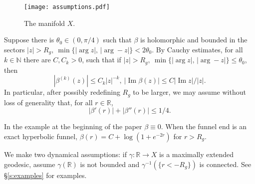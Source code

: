 \documentclass[reqno, 12pt]{amsart}
\newcommand \N {\mathbb{N}}
\newcommand \R {\mathbb{R}}
\DeclareMathOperator \im {Im}
\theoremstyle{definition}
\numberwithin{equation}{section}
\numberwithin{prop}{section}
\numberwithin{figure}{section}
\begin{document}
\begin{figure}[htbp]
\texttt{[image: assumptions.pdf]}
\caption{The manifold $X$.}\label{f:mfld}
\end{figure}

Suppose there is $\theta_0 \in (0,\pi/4)$ such that $\beta$ is holomorphic and bounded in the sectors $|z| > R_g,\ \min\{|\arg z|,\, |\arg -z|\} < 2\theta_0$. By Cauchy estimates,  for all $k \in \N$ there are $C, C_k >0$,  such that if $|z| > R_g,\ \min\{|\arg z|,\, |\arg -z|\} \le \theta_0$, then 
\[
|\beta^{(k)}(z)| \le C_k |z|^{-k}, \ |\im \beta(z)| \le C |\im z|/|z|.
\]
In particular, after possibly redefining $R_g$ to be larger, we may assume without loss of generality that, for all $r \in \R$,
\begin{equation}\label{e:betahalf}
|\beta'(r)| + |\beta''(r)| \le 1/4.
\end{equation}


In the example at the beginning of the paper $\beta \equiv 0$. When the funnel end is an exact hyperbolic funnel, $\beta(r) =C +  \log(1 + e^{-2r})$ for $r> R_g$.

We make two dynamical assumptions: if $\gamma \colon \R \to X$ is a maximally extended geodesic, assume $\gamma(\R)$ is not bounded and  $\gamma^{-1}(\{r < -R_g\})$ is connected. See \S\ref{s:examples} for examples.

\end{document}
